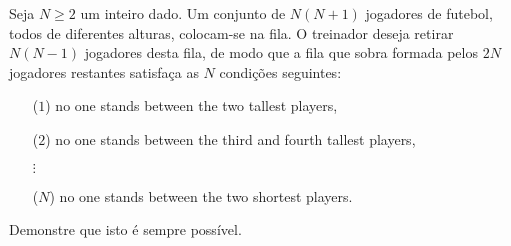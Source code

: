 Seja $N \ge 2$ um inteiro dado. Um conjunto de $N(N + 1)$ jogadores de futebol, todos de diferentes alturas, colocam-se na fila. O treinador deseja retirar $N(N - 1)$ jogadores desta fila, de modo que a fila que sobra formada pelos $2N$ jogadores restantes satisfaça as $N$ condições seguintes:
\begin{itemize}
	\item[($1$)] no one stands between the two tallest players,
	\item[($2$)] no one stands between the third and fourth tallest players,
	\item[$\vdots$]
	\item[($N$)] no one stands between the two shortest players.
\end{itemize}
Demonstre que isto é sempre possível.
